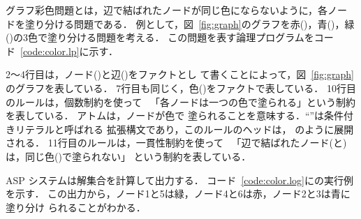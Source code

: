 グラフ彩色問題とは，辺で結ばれたノードが同じ色にならないように，各ノー
ドを塗り分ける問題である．
例として，図~\ref{fig:graph}のグラフを赤()，青()，緑
()の3色で塗り分ける問題を考える．
この問題を表す論理プログラムをコード~\ref{code:color.lp}に示す．

2〜4行目は，ノード()と辺()をファクトとし
て書くことによって，図~\ref{fig:graph}のグラフを表している．
7行目も同じく，色()をファクトで表している．
%
10行目のルールは，個数制約を使って
\ 「\!各ノードは一つの色で塗られる」という制約を表している．
アトムは，ノードが色で
塗られることを意味する．``\code{:}''は条件付きリテラルと呼ばれる
拡張構文であり，このルールのヘッドは，
のように展開される．
11行目のルールは，一貫性制約を使って
\ 「\!辺で結ばれたノード(と)は，同じ色()で塗られない」
という制約を表している．

ASP システムは解集合を計算して出力する．
コード~\ref{code:color.log}に{\clingo}の実行例を示す．
この出力から，ノード1と5は緑，ノード4と6は赤，ノード2と3は青に塗り分け
られることがわかる．

